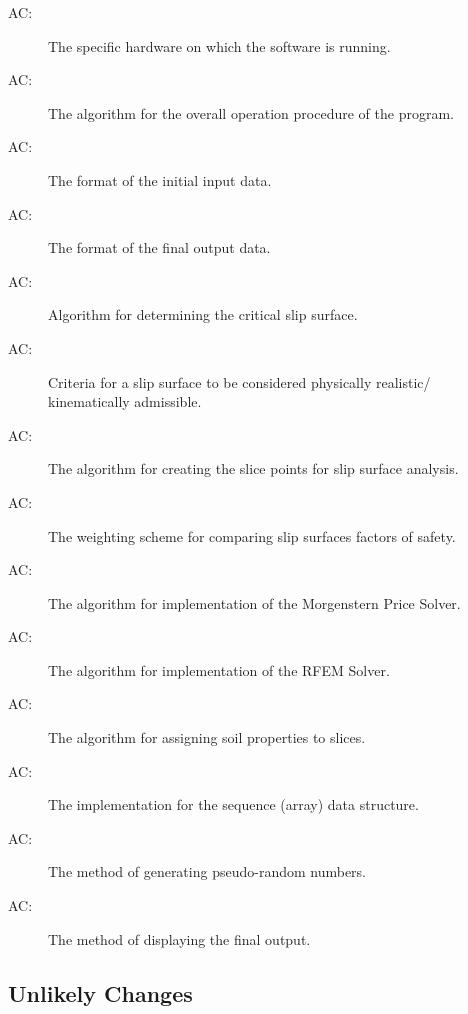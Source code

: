 \documentclass[12pt]{article}
\newcounter{acnum}
\begin{document}
\begin{description}
\item[AC\theacnum \label{AC_hardware}:] The
  specific hardware on which the software is running.
\item[AC\theacnum \label{AC_Control}:] The
  algorithm for the overall operation procedure of the program.
\item[AC\theacnum \label{AC_input}:] The format
  of the initial input data.
\item[AC\theacnum \label{AC_output}:] The format
  of the final output data.
\item[AC\theacnum \label{AC_GenAlg}:] Algorithm
  for determining the critical slip surface.
\item[AC\theacnum \label{AC_Kin}:] Criteria for
  a slip surface to be considered physically realistic/ kinematically
  admissible.
\item[AC\theacnum \label{AC_Slicer}:] The
  algorithm for creating the slice points for slip surface analysis.
\item[AC\theacnum \label{AC_FSweight}:] The
  weighting scheme for comparing slip surfaces factors of safety.
\item[AC\theacnum \label{AC_MP}:] The
  algorithm for implementation of the Morgenstern Price Solver.
\item[AC\theacnum \label{AC_RFEM}:] The
  algorithm for implementation of the RFEM Solver.
\item[AC\theacnum \label{AC_PropSorter}:] The
  algorithm for assigning soil properties to slices.
\item[AC\theacnum \label{AC_Array}:] The
  implementation for the sequence (array) data structure.
\item[AC\theacnum \label{AC_Rand}:] The method
  of generating pseudo-random numbers.
\item[AC\theacnum \label{AC_Plot}:] The method
  of displaying the final output.
\end{description}


\subsection{Unlikely Changes} \label{SecUchange}
\end{document}
